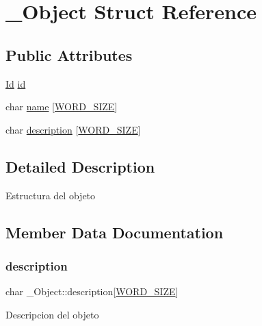 \hypertarget{struct__Object}{}\section{\+\_\+\+Object Struct Reference}
\label{struct__Object}
\subsection*{Public Attributes}
\begin{DoxyCompactItemize}
\item 
\hyperlink{types_8h_a845e604fb28f7e3d97549da3448149d3}{Id} \hyperlink{struct__Object_a3cff7a0e8dc4e9d23895ed9af1b7653a}{id}
\item 
char \hyperlink{struct__Object_a3dab853826b88558a2c07dec50b96d57}{name} \mbox{[}\hyperlink{types_8h_a92ed8507d1cd2331ad09275c5c4c1c89}{W\+O\+R\+D\+\_\+\+S\+I\+ZE}\mbox{]}
\item 
char \hyperlink{struct__Object_a556e2e37c1461bcaae6492d2101f407d}{description} \mbox{[}\hyperlink{types_8h_a92ed8507d1cd2331ad09275c5c4c1c89}{W\+O\+R\+D\+\_\+\+S\+I\+ZE}\mbox{]}
\end{DoxyCompactItemize}


\subsection{Detailed Description}
Estructura del objeto 

\subsection{Member Data Documentation}
\mbox{\label{struct__Object_a556e2e37c1461bcaae6492d2101f407d}} 
\subsubsection{\texorpdfstring{description}{description}}
{\footnotesize\ttfamily char \+\_\+\+Object\+::description\mbox{[}\hyperlink{types_8h_a92ed8507d1cd2331ad09275c5c4c1c89}{W\+O\+R\+D\+\_\+\+S\+I\+ZE}\mbox{]}}

Descripcion del objeto \mbox{\label{struct__Object_a3cff7a0e8dc4e9d23895ed9af1b7653a}} 
